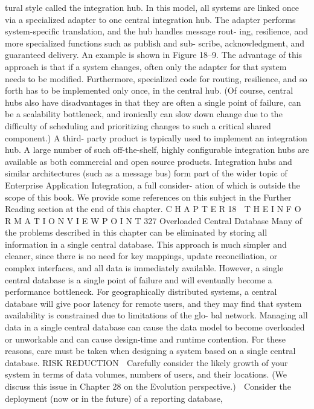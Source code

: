 tural style called the integration hub. In this model, all systems are linked
once via a specialized adapter to one central integration hub. The adapter
performs system-specific translation, and the hub handles message rout-
ing, resilience, and more specialized functions such as publish and sub-
scribe, acknowledgment, and guaranteed delivery. An example is shown
in Figure 18–9.
The advantage of this approach is that if a system changes, often only
the adapter for that system needs to be modified. Furthermore, specialized
code for routing, resilience, and so forth has to be implemented only once,
in the central hub. (Of course, central hubs also have disadvantages in
that they are often a single point of failure, can be a scalability bottleneck,
and ironically can slow down change due to the difficulty of scheduling
and prioritizing changes to such a critical shared component.) A third-
party product is typically used to implement an integration hub. A large
number of such off-the-shelf, highly configurable integration hubs are
available as both commercial and open source products.
Integration hubs and similar architectures (such as a message bus) form
part of the wider topic of Enterprise Application Integration, a full consider-
ation of which is outside the scope of this book. We provide some references
on this subject in the Further Reading section at the end of this chapter.
C H A P T E R 18  T H E I N F O R M A T I O N V I E W P O I N T
 327
Overloaded Central Database
Many of the problems described in this chapter can be eliminated by storing
all information in a single central database. This approach is much simpler
and cleaner, since there is no need for key mappings, update reconciliation, or
complex interfaces, and all data is immediately available.
However, a single central database is a single point of failure and will
eventually become a performance bottleneck. For geographically distributed
systems, a central database will give poor latency for remote users, and they
may find that system availability is constrained due to limitations of the glo-
bal network. Managing all data in a single central database can cause the data
model to become overloaded or unworkable and can cause design-time and
runtime contention. For these reasons, care must be taken when designing a
system based on a single central database.
RISK REDUCTION
 Carefully consider the likely growth of your system in terms of data
volumes, numbers of users, and their locations. (We discuss this issue in
Chapter 28 on the Evolution perspective.)
 Consider the deployment (now or in the future) of a reporting database,
